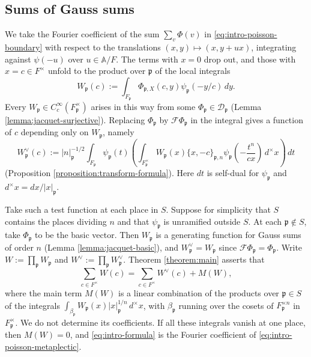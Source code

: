 \documentclass[reqno]{amsart}
\theoremstyle{plain}
\theoremstyle{definition}
\theoremstyle{itplain}
\numberwithin{equation}{section}
\numberwithin{theorem}{section}
\begin{document}
\subsection{Sums of Gauss sums}\label{sec:intro-gauss-sums}
We take the Fourier coefficient of the sum $\sum_v \Phi(v)$ in \eqref{eq:intro-poisson-boundary} with respect to the translations $(x, y) \mapsto (x, y + u x)$, integrating against $\psi(-u)$ over $u \in \mathbb{A} / F$.  The terms with $x = 0$ drop out, and those with $x = c \in F^\times$ unfold to the product over $\mathfrak{p}$ of the local integrals
\begin{equation*}
  W_{\mathfrak{p}}(c) := \int_{F_{\mathfrak{p}}} \Phi_{\mathfrak{p}, X}(c, y) \psi_{\mathfrak{p}}(-y/c) \, d y.
\end{equation*}
Every $W_{\mathfrak{p}} \in C_c^\infty(F_{\mathfrak{p}}^\times)$ arises in this way from some $\Phi_{\mathfrak{p}} \in \mathcal{D}_{\mathfrak{p}}$ (Lemma \ref{lemma:jacquet-surjective}).  Replacing $\Phi_{\mathfrak{p}}$ by $\mathcal{F} \Phi_{\mathfrak{p}}$ in the integral gives a function of $c$ depending only on $W_{\mathfrak{p}}$, namely
\begin{equation*}
  W_{\mathfrak{p}}^\vee(c) :=
  \lvert n \rvert_{\mathfrak{p}}^{-1/2}
  \int_{F_{\mathfrak{p}}} \psi_{\mathfrak{p}}(t)
  \left( \int_{F_{\mathfrak{p}}^\times}
    W_{\mathfrak{p}}(x) \{x,-c\}_{\mathfrak{p},n}
    \psi_{\mathfrak{p}}\!\left(-\frac{t^n}{cx}\right) \, d^\times x \right) \, d t
\end{equation*}
(Proposition \ref{proposition:transform-formula}).  Here $d t$ is self-dual for $\psi_{\mathfrak{p}}$ and $d^\times x = d x / \lvert x \rvert_{\mathfrak{p}}$.

Take such a test function at each place in $S$.  Suppose for simplicity that $S$ contains the places dividing $n$ and that $\psi_{\mathfrak{p}}$ is unramified outside $S$.  At each $\mathfrak{p} \notin S$, take $\Phi_{\mathfrak{p}}$ to be the basic vector.  Then $W_{\mathfrak{p}}$ is a generating function for Gauss sums of order $n$ (Lemma \ref{lemma:jacquet-basic}), and $W_{\mathfrak{p}}^\vee = W_{\mathfrak{p}}$ since $\mathcal{F} \Phi_{\mathfrak{p}} = \Phi_{\mathfrak{p}}$.  Write $W := \prod_{\mathfrak{p}} W_{\mathfrak{p}}$ and $W^\vee := \prod_{\mathfrak{p}} W_{\mathfrak{p}}^\vee$.  Theorem \ref{theorem:main} asserts that
\begin{equation}\label{eq:intro-formula}
  \sum_{c \in F^\times} W(c) = \sum_{c \in F^\times} W^\vee(c) + M(W),
\end{equation}
where the main term $M(W)$ is a linear combination of the products over $\mathfrak{p} \in S$ of the integrals $\int_{\beta_{\mathfrak{p}}} W_{\mathfrak{p}}(x) \lvert x \rvert_{\mathfrak{p}}^{1/n} \, d^\times x$, with $\beta_{\mathfrak{p}}$ running over the cosets of $F_{\mathfrak{p}}^{\times n}$ in $F_{\mathfrak{p}}^\times$.  We do not determine its coefficients.  If all these integrals vanish at one place, then $M(W) = 0$, and \eqref{eq:intro-formula} is the Fourier coefficient of \eqref{eq:intro-poisson-metaplectic}.
\end{document}
